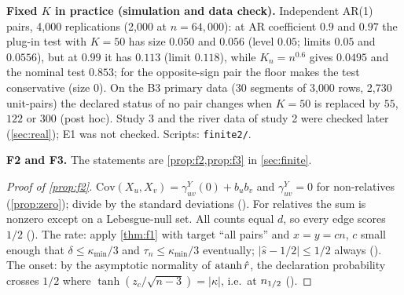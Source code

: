 \textbf{Fixed $K$ in practice (simulation and data check).} Independent AR(1)
pairs, 4{,}000 replications (2{,}000 at $n=64{,}000$): at AR coefficient
$0.9$ and $0.97$ the plug-in test with $K=50$ has size $0.050$ and $0.056$
(level $0.05$; limits $0.05$ and $0.0556$), but at $0.99$ it has $0.113$
(limit $0.118$), while $K_n=n^{0.6}$ gives $0.0495$ and the nominal test
$0.853$; for the opposite-sign pair the floor makes the test conservative
(size $0$). On the B3 primary data (30 segments of 3{,}000 rows, 2{,}730
unit-pairs) the declared status of no pair changes when $K=50$ is replaced
by $55$, $122$ or $300$ (post hoc). Study 3 and the river data of study 2 were checked later (\cref{sec:real});
E1 was not checked. Scripts: \texttt{finite2/}.


\textbf{F2 and F3.} The statements are \cref{prop:f2,prop:f3} in \cref{sec:finite}.

\begin{proof}[Proof of \cref{prop:f2}]
$\mathrm{Cov}(X_u,X_v)=\gamma^Y_{uv}(0)+b_ub_v$ and $\gamma^Y_{uv}=0$ for
non-relatives (\cref{prop:zero}); divide by the standard deviations
(). For relatives the sum is nonzero except on a
Lebesgue-null set. All counts equal $d$, so every edge scores $1/2$
(). The rate: apply \cref{thm:f1} with target ``all
pairs'' and $x=y=cn$, $c$ small enough that $\delta\le\kappa_{\min}/3$ and
$\tau_n\le\kappa_{\min}/3$ eventually; $|\hat s-1/2|\le1/2$ always
(). The onset: by the asymptotic normality of
$\operatorname{atanh}\hat r$, the declaration probability crosses $1/2$ where
$\tanh(z_c/\sqrt{n-3})=|\kappa|$, i.e.\ at $n_{1/2}$ ().
\end{proof}


